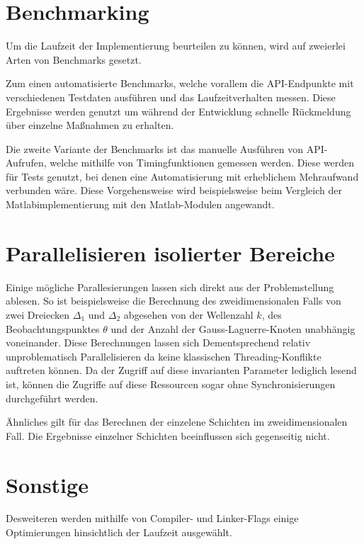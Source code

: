 \section{Benchmarking}


Um die Laufzeit der Implementierung beurteilen zu können, wird auf zweierlei Arten von Benchmarks gesetzt.

Zum einen automatisierte Benchmarks, welche vorallem die API-Endpunkte mit verschiedenen Testdaten ausführen und das Laufzeitverhalten messen.
Diese Ergebnisse werden genutzt um während der Entwicklung schnelle Rückmeldung über einzelne Maßnahmen zu erhalten.

Die zweite Variante der Benchmarks ist das manuelle Ausführen von API-Aufrufen, welche mithilfe von Timingfunktionen gemessen werden.
Diese werden für Tests genutzt, bei denen eine Automatisierung mit erheblichem Mehraufwand verbunden wäre.
Diese Vorgehensweise wird beispielsweise beim Vergleich der Matlabimplementierung mit den Matlab-Modulen angewandt. 

\section{Parallelisieren isolierter Bereiche}

Einige mögliche Parallesierungen lassen sich direkt aus der Problemstellung ablesen. 
So ist beispielsweise die Berechnung des zweidimensionalen Falls von zwei Dreiecken $\Delta_1$ und $\Delta_2$ abgesehen von 
der Wellenzahl $k$, des Beobachtungspunktes $\theta$ und der Anzahl der Gauss-Laguerre-Knoten unabhängig voneinander.
Diese Berechnungen lassen sich Dementsprechend relativ unproblematisch Parallelisieren da keine klassischen Threading-Konflikte auftreten können.
Da der Zugriff auf diese invarianten Parameter lediglich lesend ist, können die Zugriffe auf diese Ressourcen sogar ohne Synchronisierungen durchgeführt werden.

Ähnliches gilt für das Berechnen der einzelene Schichten im zweidimensionalen Fall. Die Ergebnisse einzelner Schichten beeinflussen sich gegenseitig nicht.

\section{Sonstige}

Desweiteren werden mithilfe von Compiler- und Linker-Flags einige Optimierungen hinsichtlich der Laufzeit ausgewählt.